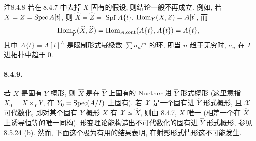 \begin{origstatement}{注}{8.4.8}\label{ch08:rem848}
若在 8.4.7 中去掉 $X$ 固有的假设, 则结论一般不再成立. 例如, 若 $X=Z=\operatorname{Spec} A[t]$, 则 $\widehat X=\widehat Z=\operatorname{Spf}A\{t\}$, $\operatorname{Hom}_Y(X,Z)=A[t]$, 而
\[\operatorname{Hom}_{\widehat Y}(\widehat X,\widehat Z)=\operatorname{Hom}_{A,\mathrm{cont}}(A\{t\},A\{t\})=A\{t\},\]
其中 $A\{t\}=A[t]^\wedge$ 是限制形式幂级数 $\sum a_nt^n$ 的环, 即当 $n$ 趋于无穷时, $a_n$ 在 $I$ 进拓扑中趋于 $0$.
\end{origstatement}

\paragraph{8.4.9.}
若 $X$ 是固有 $Y$ 概形, 则 $\widehat X$ 是在 $\widehat Y$ 上固有的 Noether 进 $\widehat Y$ 形式概形 (这里意指 $X_0=X\times_YY_0$ 在 $Y_0=\operatorname{Spec}(A/I)$ 上固有). 若 $\mathcal X$ 是一个固有进 $\widehat Y$ 形式概形, 且 $\mathcal X$ 可代数化, 即对某个固有 $Y$ 概形 $X$ 有 $\mathcal X\simeq\widehat X$, 则由 8.4.7, $X$ 唯一 (相差一个在 $\widehat X$ 上诱导恒等的唯一同构). 形变理论能构造出不可代数化的固有进 $\widehat Y$ 形式概形, 参见 8.5.24 (b). 然而, 下面这个极为有用的结果表明, 在射影形式情形这不可能发生.


